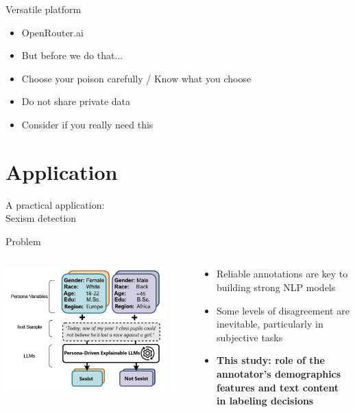 \documentclass[t,xcolor={dvipsnames},final,aspectratio=169]{beamer}
\begin{document}
\begin{frame}{Versatile platform}
\begin{itemize}
\item \huge{OpenRouter.ai}
\item But before we do that...
\item Choose your poison carefully / Know what you choose
\item Do not share private data
\item Consider if you really need this
\end{itemize}
\end{frame}

\section{Application}
\begin{frame}{}
\huge{A practical application:\\

Sexism detection}
\end{frame}

\begin{frame}{Problem}
  \begin{columns}
    \begin{column}{0.45\textwidth}
    \begin{center}
\includegraphics[width=0.9\textwidth]{img/problem.png}
\end{center}
    \end{column}
    \begin{column}{0.45\textwidth}  %
\begin{itemize}
\item Reliable annotations are key to building strong NLP models
\item Some levels of disagreement are inevitable, particularly in subjective tasks
\item \textbf{This study: role of the annotator’s demographics features and text content in labeling decisions}
\end{itemize}
    \end{column}
  \end{columns}
\end{frame}
\end{document}

